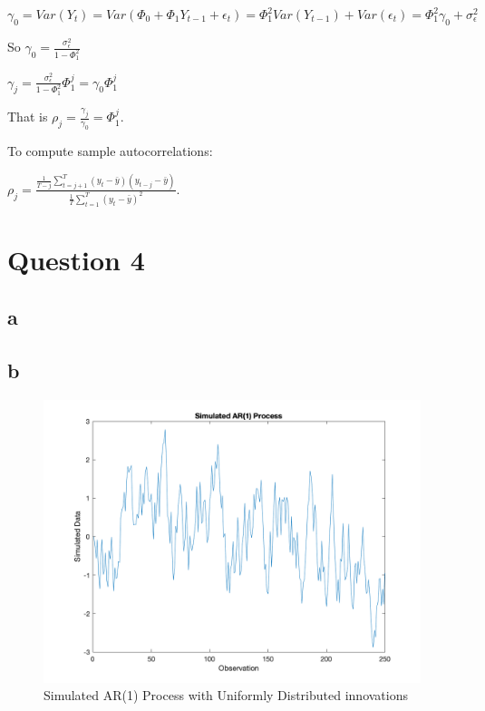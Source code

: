 \documentclass{report}
\begin{document}
 $\gamma_0=Var(Y_t)=Var(\Phi_0+\Phi_1 Y_{t-1}+\epsilon_t)=\Phi_1^2 Var(Y_{t-1})+Var(\epsilon_t)=\Phi_1^2 \gamma_0+\sigma_\epsilon^2$

So $\gamma_0=\frac{\sigma_\epsilon^2}{1-\Phi_1^2}$

$\gamma_j=\frac{\sigma_\epsilon^2}{1-\Phi_1^2} \Phi_1^j=\gamma_0 \Phi_1^j$

That is $\rho_j=\frac{\gamma_j}{\gamma_0}=\Phi_1^j$.

To compute sample autocorrelations:

$\rho_j=\frac{ \frac{1}{T-j} \sum_{t=j+1}^{T} (y_t-\bar{y})(y_{t-j}-\bar{y})}{ \frac{1}{T} \sum_{t=1}^{T} (y_t-\bar{y})^2  }$.



\section*{Question 4}

\subsection*{a}



\subsection*{b}

\begin{figure}[H]
	\centering
	\includegraphics[width = 11cm]{4b}
	\caption{Simulated AR(1) Process with Uniformly Distributed innovations} 
\end{figure}
\end{document}
